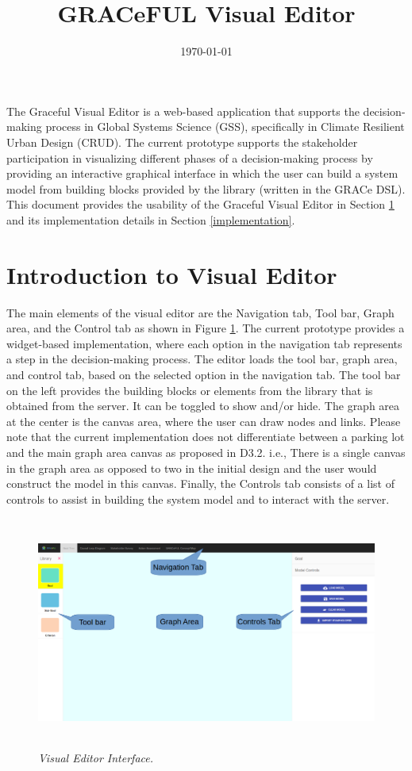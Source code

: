 \documentclass[a4paper]{article}
\title{GRACeFUL Visual Editor}
\date{\today}
\begin{document}
\maketitle
The Graceful Visual Editor is a web-based application that supports the decision-making process in Global Systems Science (GSS), specifically in Climate Resilient Urban Design (CRUD).
The current prototype supports the stakeholder participation in visualizing different phases of a decision-making process by providing an interactive graphical interface in which the user can build a system model from building blocks provided by the library (written in the GRACe DSL). This document provides the usability of the Graceful Visual Editor in Section \ref{intro} and its implementation details in Section \ref{implementation}.

\section{Introduction to Visual Editor}
\label{intro}
The main elements of the visual editor are the Navigation tab, Tool bar, Graph area, and the Control tab as shown in Figure \ref{fig:layout}. The current prototype provides a widget-based implementation, where each option in the navigation tab represents a step in the decision-making process. The editor loads the tool bar, graph area, and control tab, based on the selected option in the navigation tab. The tool bar on the left provides the building blocks or elements from the library that is obtained from the server. It can be toggled to show and/or hide. The graph area at the center is the canvas area, where the user can draw nodes and links. Please note that the current implementation does not differentiate between a parking lot and the main graph area canvas as proposed in D3.2. i.e., There is a single canvas in the graph area as opposed to two in the initial design and the user would construct the model in this canvas. Finally, the Controls tab consists of a list of controls to assist in building the system model and to interact with the server.

\begin{figure}
\begin{center}
\includegraphics[height=3in,width=5in]{img/layout.png}
\caption{\small \sl Visual Editor Interface.\label{fig:layout}}
\end{center}
\end{figure}
\end{document}
